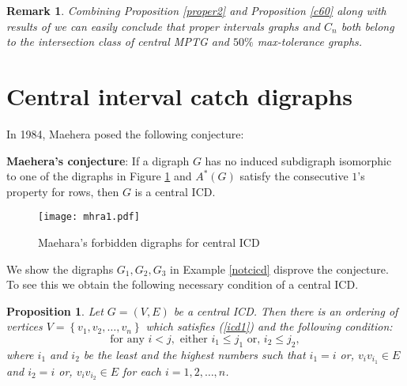 \documentclass{article}
\newtheorem{rmk}[thm]{Remark}
\newtheorem{prop}[thm]{Proposition}
\theoremstyle{definition}
\numberwithin{equation}{section}
\newcommand{\set}[1]{\left\{#1\right\}}
\begin{document}
\begin{rmk}
{\em Combining Proposition \ref{proper2} and Proposition \ref{c60} along with results of \cite{Soto} we can easily conclude that proper intervals graphs and $C_{n}$ both belong to the intersection class of central MPTG and $50\%$ max-tolerance graphs}.
\end{rmk}



\section{Central interval catch digraphs}

\noindent
In 1984, Maehera posed the following conjecture:

\noindent \textbf{Maehera's conjecture}\cite{Maehera}: \label{conj1} If a digraph $G$ has no induced subdigraph isomorphic to one of the digraphs in Figure \ref{mhfig} and $A^*(G)$ satisfy the consecutive $1$'s property for rows, then $G$ is a central ICD.

\begin{figure}
	\centering
	
	\texttt{[image: mhra1.pdf]}
	\caption{Maehara's forbidden digraphs for central ICD}\label{mhfig}    
\end{figure}

\noindent 
We show the digraphs $G_1,G_2,G_3$ in Example \ref{notcicd} disprove the conjecture. To see this we obtain the following necessary condition of a central ICD.

\begin{prop}\label{lcicd}
Let $G=(V,E)$ be a central ICD. Then there is an ordering of vertices $V=\set{v_1,v_2,\ldots,v_n}$ which satisfies (\ref{icd1}) and the following condition:
\begin{equation}\label{cicd2}
\text{for any }i<j,\text{ either }i_1\leqslant j_1\text{ or, }i_2\leqslant j_2,
\end{equation}
where $i_1$ and $i_2$ be the least and the highest numbers such that $i_1=i$ or, $v_iv_{i_1}\in E$ and $i_2=i$ or, $v_iv_{i_2}\in E$ for each $i=1,2,\ldots,n$. 
\end{prop}
\end{document}
